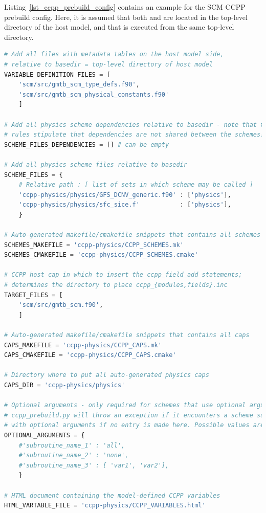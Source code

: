 Listing~\ref{lst_ccpp_prebuild_config} contains an example for the SCM CCPP prebuild config. Here, it is assumed that both  and  are located in the top-level directory of the host model, and that  is executed from the same top-level directory.
\begin{lstlisting}[language=python,
                 basicstyle=\scriptsize\ttfamily,
                 label=lst_ccpp_prebuild_config,
                 float=p,
                 caption=CCPP prebuild config for SCM (shortened)]
# Add all files with metadata tables on the host model side,
# relative to basedir = top-level directory of host model
VARIABLE_DEFINITION_FILES = [
    'scm/src/gmtb_scm_type_defs.f90',
    'scm/src/gmtb_scm_physical_constants.f90'
    ]

# Add all physics scheme dependencies relative to basedir - note that the CCPP
# rules stipulate that dependencies are not shared between the schemes!
SCHEME_FILES_DEPENDENCIES = [] # can be empty

# Add all physics scheme files relative to basedir
SCHEME_FILES = {
    # Relative path : [ list of sets in which scheme may be called ]
    'ccpp-physics/physics/GFS_DCNV_generic.f90' : ['physics'],
    'ccpp-physics/physics/sfc_sice.f'           : ['physics'],
    }

# Auto-generated makefile/cmakefile snippets that contains all schemes
SCHEMES_MAKEFILE = 'ccpp-physics/CCPP_SCHEMES.mk'
SCHEMES_CMAKEFILE = 'ccpp-physics/CCPP_SCHEMES.cmake'

# CCPP host cap in which to insert the ccpp_field_add statements;
# determines the directory to place ccpp_{modules,fields}.inc
TARGET_FILES = [
    'scm/src/gmtb_scm.f90',
    ]

# Auto-generated makefile/cmakefile snippets that contains all caps
CAPS_MAKEFILE = 'ccpp-physics/CCPP_CAPS.mk'
CAPS_CMAKEFILE = 'ccpp-physics/CCPP_CAPS.cmake'

# Directory where to put all auto-generated physics caps
CAPS_DIR = 'ccpp-physics/physics'

# Optional arguments - only required for schemes that use optional arguments.
# ccpp_prebuild.py will throw an exception if it encounters a scheme subroutine
# with optional arguments if no entry is made here. Possible values are:
OPTIONAL_ARGUMENTS = {
    #'subroutine_name_1' : 'all',
    #'subroutine_name_2' : 'none',
    #'subroutine_name_3' : [ 'var1', 'var2'],
    }

# HTML document containing the model-defined CCPP variables
HTML_VARTABLE_FILE = 'ccpp-physics/CCPP_VARIABLES.html'


\end{lstlisting}
